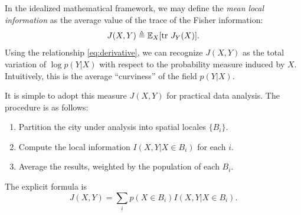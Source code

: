 \documentclass[english]{scrartcl}
\begin{document}
		In the idealized mathematical framework, we may define the \emph{mean local information} as the average value of the trace of the Fisher information: 
		\begin{equation}
			J(X,Y) \triangleq \mathbb{E}_X[\text{tr } J_Y(X)].
		\end{equation}
		Using the relationship \eqref{eq:derivative}, we can recognize $J(X,Y)$ as the total variation of $\log p(Y|X)$ with respect to the probability measure induced by $X$. Intuitively, this is the average ``curviness'' of the field $p(Y|X)$. 

		It is simple to adopt this measure $J(X,Y)$ for practical data analysis. The procedure is as follows: 
		\begin{enumerate}
		 	\item Partition the city under analysis into spatial locales $\{B_i\}$.
		 	\item Compute the local information $I(X,Y|X \in B_i)$ for each $i$. 
		 	\item Average the results, weighted by the population of each $B_i$. 
		\end{enumerate} 
		The explicit formula is 
		\begin{equation}
			J(X,Y) = \sum_i p(X \in B_i) I(X,Y|X \in B_i). \label{eq:formula}
		\end{equation}
\end{document}
